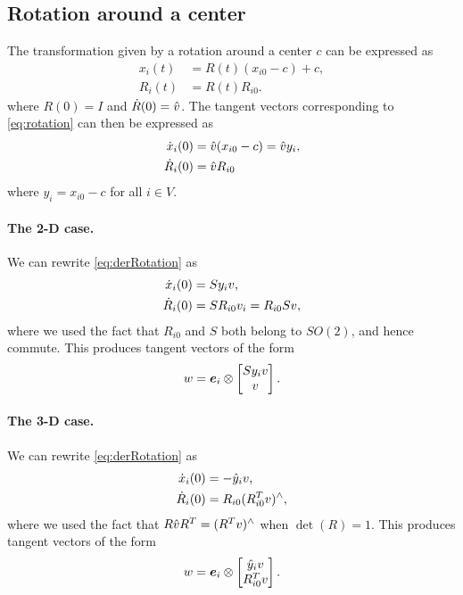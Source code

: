 \documentclass[12pt]{article}
\newcommand{\dxi}{\dot{x}_i}
\newcommand{\kron}{\otimes}
\begin{document}
\subsection{Rotation around a center}
The transformation given by a rotation around a center $c$ can be expressed as
\begin{equation}
\begin{aligned}
\label{eq:rotation}
  x_i(t)&=R(t)(x_{i0}-c)+c,\\
  R_i(t)&=R(t)R_{i0}.
\end{aligned}
\end{equation}
where $R(0)=I$ and $\dot{R}(0)=\hat{v}$.
The tangent vectors corresponding to \eqref{eq:rotation} can then be expressed as
\begin{equation}
\begin{aligned}
\label{eq:derRotation}
  \dxi(0)&=\hat{v}(x_{i0}-c)=\hat{v}y_i,\\
  \dR_i(0)&=\hat{v}R_{i0}
\end{aligned}
\end{equation}
where $y_i=x_{i0}-c$ for all $i\in V$.
\paragraph{The 2-D case.} We can rewrite \eqref{eq:derRotation} as 
\begin{equation}
\begin{aligned}
\label{eq:derRotation-2D}
  \dxi(0)&=Sy_iv,\\
  \dR_i(0)&=SR_{i0}v_i=R_{i0}Sv,
\end{aligned}
\end{equation}
where we used the fact that $R_{i0}$ and $S$ both belong to $SO(2)$, and hence commute.
This produces tangent vectors of the form
\begin{equation}
  \label{eq:tangentVectorRotation-2D}
  w=\vct{e}_i \kron \bmat{Sy_i v\\v}.  
\end{equation}
\paragraph{The 3-D case.} We can rewrite \eqref{eq:derRotation} as
\begin{equation}
\begin{aligned}
\label{eq:derRotation-3D}
  \dxi(0)&=-\hat{y}_iv,\\
  \dR_i(0)&=R_{i0}(R_{i0}\transpose v)^\wedge,
\end{aligned}
\end{equation}
where we used the fact that $R\hat{v}R^T=(R^T v)^\wedge$ when $\det(R)=1$. 
This produces tangent vectors of the form
\begin{equation}
  \label{eq:tangentVectorRotation-3D}
  w=\vct{e}_i \kron \bmat{\hat{y}_i v\\R_{i0}\transpose v}.  
\end{equation}
\end{document}
